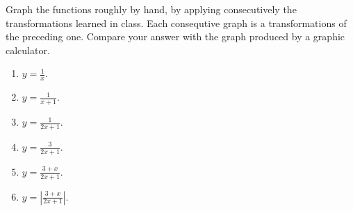 Graph the functions roughly by hand, by applying consecutively the transformations learned in class. Each consequtive graph is a transformations of the preceding one. Compare your answer with the graph produced by a graphic calculator.
\begin{multicols}{2}
\begin{enumerate}
\item $y=\frac{1}{x}$.
\item $y=\frac{1}{x+1}$.
\item $y=\frac{1}{2x+1}$.
\item $y=\frac{3}{2x+1}$.
\item $y=\frac{3+x}{2x+1}$.
\item $y=\left|\frac{3+x}{2x+1}\right|$.
\end{enumerate}
\end{multicols}

